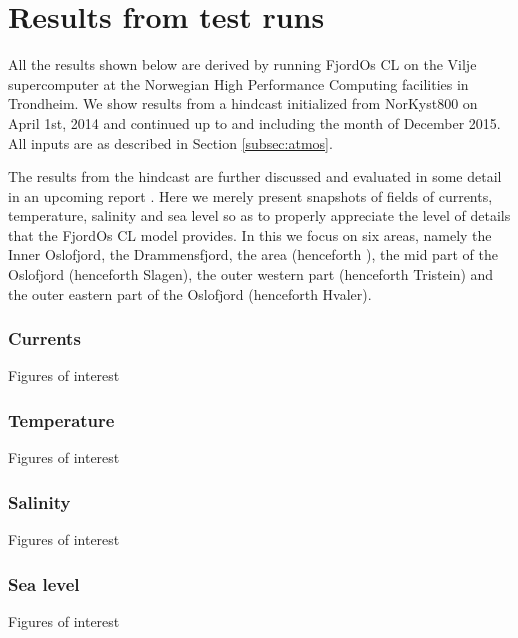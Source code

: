 \section{Results from test runs}
\label{sec:resul}
All the results shown below are derived by running FjordOs CL on the Vilje supercomputer at the Norwegian High Performance Computing facilities in Trondheim. We show results from a hindcast initialized from NorKyst800 on April 1st, 2014 and continued up to and including the month of December 2015. 
All inputs are as described in Section \ref{subsec:atmos}.
 
The results from the hindcast are further discussed and evaluated in some detail in an upcoming report \citep{hjelm:etal:2016}. Here we merely present snapshots of fields of currents, temperature, salinity and sea level so as to properly appreciate the level of details that the FjordOs CL model provides. In this we focus on six areas, namely the Inner Oslofjord, the Drammensfjord, the {\DR} area (henceforth {\DR}), the mid part of the Oslofjord (henceforth Slagen), the outer western part (henceforth Tristein) and the outer eastern part of the Oslofjord (henceforth Hvaler). 

\subsubsection{Currents}
 Figures of interest 

\subsubsection{Temperature}
Figures of interest 

\subsubsection{Salinity}
Figures of interest 

\subsubsection{Sea level}
Figures of interest 